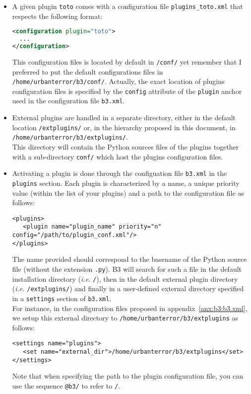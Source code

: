 \begin{itemize}
\item A given  plugin \texttt{toto} comes with a configuration file
  \texttt{plugins\_toto.xml} that respects the following format: 
  \begin{lstlisting}[language=xml,numbers=none,]
<configuration plugin="toto">
  ...
</configuration>    
  \end{lstlisting}
  This configuration files is located by default in \begginstall\texttt{/conf/}
  yet remember that I preferred to put the default configurations files in    
  \texttt{/home/urbanterror/b3/conf/}.
  Actually, the exact location of plugins configuration files is specified by
  the \texttt{config} attribute of the \texttt{plugin} anchor used in the
  configuration file \texttt{b3.xml}.
\item External plugins are handled in a separate directory, either in the
  default location \begginstall\texttt{/extplugins/} or, in the hierarchy
  proposed in this document, in \texttt{/home/urbanterror/b3/extplugins/}.\\
  This directory will contain the Python sources files of the plugins together
  with a sub-directory \texttt{conf/} which host the plugins configuration
  files.
\item Activating a plugin is done through the configuation file \texttt{b3.xml} in
  the \texttt{plugins} section.  
  Each plugin is characterized by a name, a unique priority value (within the
  list of your plugins) and a path to
  the configuration file as follows: 
  \begin{lstlisting}[style=apachecfg]
<plugins>
   <plugin name="plugin_name" priority="n"  config="/path/to/plugin_conf.xml"/>
</plugins>
  \end{lstlisting}
  The name provided should correspond to the basename of the Python source file
  (without the extension \texttt{.py}).  
  B3 will search for such a file in the default installation directory
  (\emph{i.e.} \begginstall\texttt{/}), then in the default external plugin
  directory (\emph{i.e.}  \begginstall\texttt{/extplugins/}) and finally in a
  user-defined external directory specified in a \texttt{settings} section of
  \texttt{b3.xml}. \\
  For instance, in the configuration files proposed in
  appendix~\ref{anx:b3:b3.xml}, we setup this external directory to
  \texttt{/home/urbanterror/b3/extplugins} as follows:
  \begin{lstlisting}[style=apachecfg]
<settings name="plugins">
   <set name="external_dir">/home/urbanterror/b3/extplugins</set>
</settings>
  \end{lstlisting}
  Note that when specifying the path to the plugin configuration file, you can
  use the sequence \texttt{@b3/} to refer to \begginstall\texttt{/}. 
\end{itemize}

